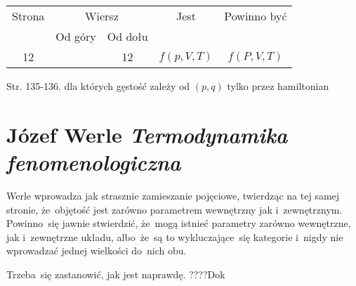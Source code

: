 \documentclass[a4paper,11pt]{article}
\numberwithin{equation}{section}
\begin{document}


\begin{center}

  \begin{tabular}{|c|c|c|c|c|}
    \hline
    Strona & \multicolumn{2}{c|}{Wiersz} & Jest
                              & Powinno być \\ \cline{2-3}
    & Od góry & Od dołu & & \\
    \hline
    12  & & 12 & $f( p, V, T )$ & $f( P, V, T )$ \\
    \hline
  \end{tabular}

\end{center}

\VerSpaceTwo


Str. 135-136. dla których gęstość zależy od $( p, q )$ tylko przez
hamiltonian \\












\section{Józef Werle \textit{Termodynamika fenomenologiczna}
  \cite{Wer57}}


\vspace{0em}



\vspace{0em}


\noindent
{} Werle wprowadza jak strasznie zamieszanie pojęciowe,
twierdząc na tej samej stronie, że~objętość jest zarówno parametrem
wewnętrzny jak i~zewnętrznym. Powinno~się jawnie stwierdzić, że~mogą
istnieć parametry zarówno wewnętrzne, jak i~zewnętrzne układu,
albo~że~są to wykluczające~się kategorie i~nigdy nie wprowadzać
jednej wielkości do~nich obu.

Trzeba~się zastanowić, jak jest naprawdę. ????Dok

\VerSpaceFour
\end{document}
